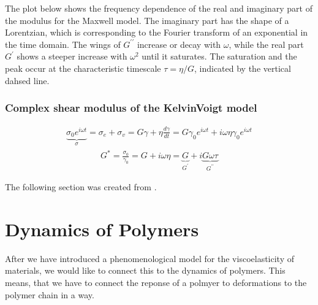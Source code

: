 \documentclass[letterpaper,10pt,english]{sphinxmanual}
\begin{document}
\sphinxAtStartPar
The plot below shows the frequency dependence of the real and imaginary part of the modulus for the Maxwell model. The imaginary part has the shape of a Lorentzian, which is corresponding to the Fourier transform of an exponential in the time domain. The wings of \(G^{\prime \prime}\) increase or decay with \(\omega\), while the real part \(G^{\prime}\) shows a steeper increase with \(\omega^2\) until it saturates. The saturation and the peak occur at the characteristic timescale
\(\tau=\eta/G\), indicated by the vertical dahsed line.

\noindent{}


\subsection{Complex shear modulus of the Kelvin\sphinxhyphen{}Voigt model}
\label{\detokenize{notebooks/L24/1_Viscoelasticity:Complex-shear-modulus-of-the-Kelvin-Voigt-model}}\begin{equation*}
\begin{split}\underbrace{\sigma_{0} e^{i \omega t}}_{\sigma}=\sigma_{e}+\sigma_{v}=G \gamma+\eta \frac{d \gamma}{d t}=G \gamma_{0} e^{i \omega t}+i \omega \eta \gamma_{0} e^{i \omega t}\end{split}
\end{equation*}\begin{equation*}
\begin{split}G^{*}=\frac{\sigma_{0}}{\gamma_{0}}=G+i \omega \eta=\underbrace{G}_{G^{\prime}}+i \underbrace{G \omega \tau}_{G^{\prime \prime}} \tag{Complex modulus Kelvin-Voigt model}\end{split}
\end{equation*}


\sphinxAtStartPar
The following section was created from .


\chapter{Dynamics of Polymers}
\label{\detokenize{notebooks/L25/1_polymer_dynamics:Dynamics-of-Polymers}}\label{\detokenize{notebooks/L25/1_polymer_dynamics::doc}}
\sphinxAtStartPar
{}

\sphinxAtStartPar
After we have introduced a phenomenological model for the viscoelasticity of materials, we would like to connect this to the dynamics of polymers. This means, that we have to connect the reponse of a polmyer to deformations to the polymer chain in a way.
\end{document}
